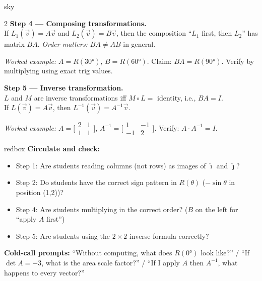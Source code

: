 \documentclass[10pt]{article}
\begin{document}
\begin{skillbox}{sky}
\begin{multicols}{2}
\textbf{Step 4 --- Composing transformations.}\\
If $L_1(\vec v)=A\vec v$ and $L_2(\vec v)=B\vec v$, then the composition ``$L_1$ first, then $L_2$'' has matrix $BA$.
\textit{Order matters:} $BA \ne AB$ in general.

\textit{Worked example:}
$A=R(30°)$, $B=R(60°)$.
Claim: $BA = R(90°)$. Verify by multiplying using exact trig values.

\columnbreak

\textbf{Step 5 --- Inverse transformation.}\\
$L$ and $M$ are inverse transformations iff $M \circ L = $ identity,
i.e., $BA = I$.\\
If $L(\vec v)=A\vec v$, then $L^{-1}(\vec v)=A^{-1}\vec v$.

\textit{Worked example:}
$A=\bigl[\begin{smallmatrix}2&1\\1&1\end{smallmatrix}\bigr]$,
$A^{-1}=\bigl[\begin{smallmatrix}1&-1\\-1&2\end{smallmatrix}\bigr]$.
Verify: $A\cdot A^{-1}=I$.
\end{multicols}
\end{skillbox}

\begin{skillbox}{redbox}
\textbf{Circulate and check:}
\begin{itemize}[leftmargin=1.4em, itemsep=3pt]
  \item Step 1: Are students reading columns (not rows) as images of $\hat{\imath}$ and $\hat{\jmath}$?
  \item Step 2: Do students have the correct sign pattern in $R(\theta)$ ($-\sin\theta$ in position (1,2))?
  \item Step 4: Are students multiplying in the correct order? ($B$ on the left for ``apply $A$ first'')
  \item Step 5: Are students using the $2\times2$ inverse formula correctly?
\end{itemize}
\textbf{Cold-call prompts:}
``Without computing, what does $R(0°)$ look like?'' /
``If $\det A = -3$, what is the area scale factor?'' /
``If I apply $A$ then $A^{-1}$, what happens to every vector?''
\end{skillbox}
\end{document}
